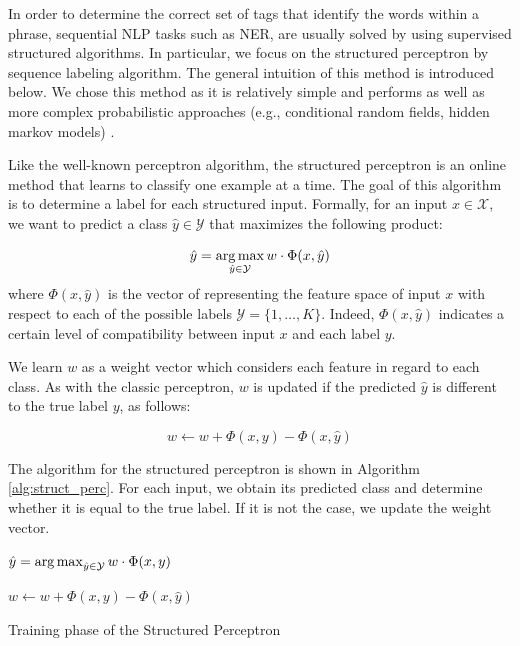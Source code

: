 In order to determine the correct set of tags that identify the words within a phrase, sequential NLP tasks such as NER, are usually solved by using supervised structured algorithms. In particular, we focus on the  structured perceptron by \cite{Collins2002} sequence labeling algorithm. The general intuition of this method is introduced below. We chose this method as it is relatively simple and performs as well as more complex probabilistic approaches (e.g., conditional random fields, hidden markov models)  \cite{Daume2006,daume2012course}. 




Like  the well-known perceptron algorithm, the structured perceptron is an online method that learns to classify one example at a time. The goal of this algorithm is to determine a label for each structured input. Formally, for an input $x \in \mathcal{X}$, we want to predict a class $\hat{y} \in \mathcal{Y}$ that maximizes the following product: 

\begin{equation}
\hat{y}= \argmax_{\hat{y}\in \mathcal{Y}}w\cdot \Phi(x,\hat{y})
\end{equation}
where $\Phi(x,\hat{y})$ is the vector of representing  the feature space of input  $x$ with respect to each of the  possible labels $\mathcal{Y}=\{1,\dots,\textit{K}\}$. Indeed,  $\Phi(x,\hat{y})$ indicates a certain level of compatibility between input $x$ and each label $y$. 

We learn $w$ as a weight vector which considers each feature in regard to each class. As with the classic perceptron, $w$ is updated if the predicted $\hat{y}$ is different to the true label $y$, as follows: 

\begin{equation}
w \leftarrow w+\Phi(x,y) - \Phi(x,\hat{y})
\end{equation}

The algorithm for the structured perceptron is shown in Algorithm \ref{alg:struct_perc}.  For each input, we obtain its predicted class and determine whether it is equal to the true label. If it is not the case, we update the weight vector.

\begin{algorithm}[htp]
\SetAlgoLined
{}
{
	{
	
		$\hat{y}= \argmax_{\hat{y}\in \mathcal{Y}}w\cdot \Phi(x,y)$
		
		{	
			$w \leftarrow w+\Phi(x,y) - \Phi(x,\hat{y})$
		}
	}
}



\caption{Training phase of the Structured Perceptron}
\label{alg:struct_perc}
\end{algorithm}


